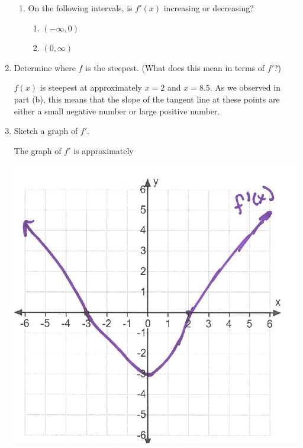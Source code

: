 \documentclass[nooutcomes]{ximera}
\begin{document}
\begin{problem}
\begin{enumerate}
\begin{enumerate}
        \item
          On the following intervals, is $f'(x)$ increasing or decreasing?
          \begin{freeResponse}
            \begin{enumerate}
		\item $(-\infty,0)$
		\item $(0,\infty)$
	\end{enumerate}
          \end{freeResponse}
      \end{enumerate}

    \item
      Determine where $f$ is the steepest.
      (What does this mean in terms of $f'$?)
      \begin{freeResponse}
        $f(x)$ is steepest at approximately $x=2$ and $x = 8.5$.
        As we observed in part (b), this means that the slope of the tangent line at these points are either a small negative number or large positive number.
      \end{freeResponse}

    \item
      Sketch a graph of $f'$.
      \begin{freeResponse}
        The graph of $f'$ is approximately
        \begin{image}
          \includegraphics[scale = 0.5]{Figure2.png}
        \end{image}
      \end{freeResponse}
  \end{enumerate}
\end{problem}
\end{document}

